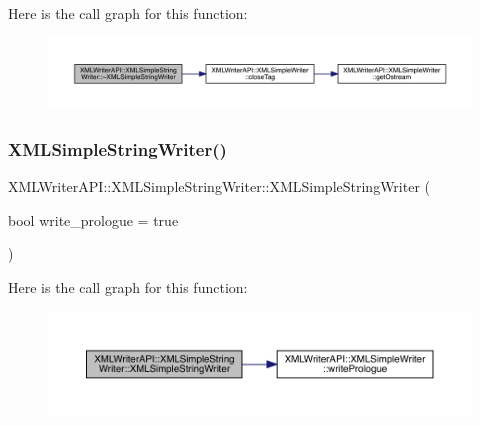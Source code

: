 Here is the call graph for this function\+:
\nopagebreak
\begin{figure}[H]
\begin{center}
\leavevmode
\includegraphics[width=350pt]{da/dec/classXMLWriterAPI_1_1XMLSimpleStringWriter_a10b08cc22793241a637eefa425e0ebe5_cgraph}
\end{center}
\end{figure}
\mbox{\label{classXMLWriterAPI_1_1XMLSimpleStringWriter_a7caa663dd64c87fa0eabc563154143a5}} 
\subsubsection{\texorpdfstring{XMLSimpleStringWriter()}{XMLSimpleStringWriter()}\hspace{0.1cm}{\footnotesize\ttfamily [2/3]}}
{\footnotesize\ttfamily X\+M\+L\+Writer\+A\+P\+I\+::\+X\+M\+L\+Simple\+String\+Writer\+::\+X\+M\+L\+Simple\+String\+Writer (\begin{DoxyParamCaption}\item[{bool}]{write\+\_\+prologue = {\ttfamily true} }\end{DoxyParamCaption})\hspace{0.3cm}{\ttfamily [inline]}}

Here is the call graph for this function\+:
\nopagebreak
\begin{figure}[H]
\begin{center}
\leavevmode
\includegraphics[width=350pt]{da/dec/classXMLWriterAPI_1_1XMLSimpleStringWriter_a7caa663dd64c87fa0eabc563154143a5_cgraph}
\end{center}
\end{figure}
\mbox{\label{classXMLWriterAPI_1_1XMLSimpleStringWriter_a10b08cc22793241a637eefa425e0ebe5}} 

